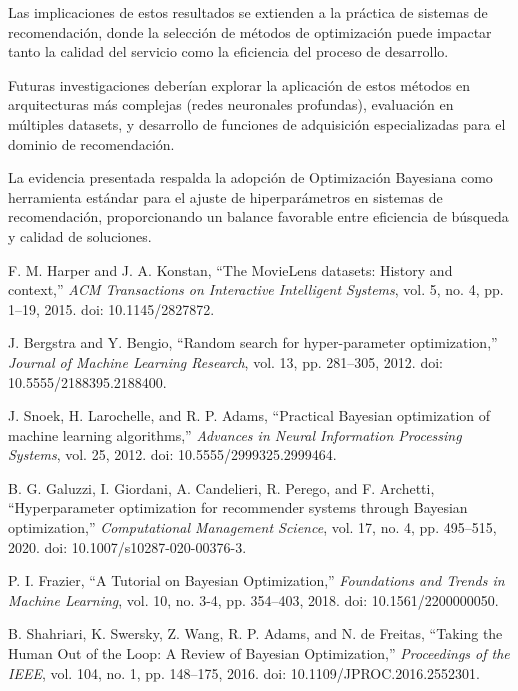 \documentclass[conference]{IEEEtran}
\begin{document}
Las implicaciones de estos resultados se extienden a la práctica de sistemas de recomendación, donde la selección de métodos de optimización puede impactar tanto la calidad del servicio como la eficiencia del proceso de desarrollo.

Futuras investigaciones deberían explorar la aplicación de estos métodos en arquitecturas más complejas (redes neuronales profundas), evaluación en múltiples datasets, y desarrollo de funciones de adquisición especializadas para el dominio de recomendación.

La evidencia presentada respalda la adopción de Optimización Bayesiana como herramienta estándar para el ajuste de hiperparámetros en sistemas de recomendación, proporcionando un balance favorable entre eficiencia de búsqueda y calidad de soluciones.

\begin{thebibliography}{00}

F. M. Harper and J. A. Konstan, ``The MovieLens datasets: History and context,'' \textit{ACM Transactions on Interactive Intelligent Systems}, vol. 5, no. 4, pp. 1--19, 2015. doi: 10.1145/2827872.

J. Bergstra and Y. Bengio, ``Random search for hyper-parameter optimization,'' \textit{Journal of Machine Learning Research}, vol. 13, pp. 281--305, 2012. doi: 10.5555/2188395.2188400.

J. Snoek, H. Larochelle, and R. P. Adams, ``Practical Bayesian optimization of machine learning algorithms,'' \textit{Advances in Neural Information Processing Systems}, vol. 25, 2012. doi: 10.5555/2999325.2999464.

B. G. Galuzzi, I. Giordani, A. Candelieri, R. Perego, and F. Archetti, ``Hyperparameter optimization for recommender systems through Bayesian optimization,'' \textit{Computational Management Science}, vol. 17, no. 4, pp. 495--515, 2020. doi: 10.1007/s10287-020-00376-3.

P. I. Frazier, ``A Tutorial on Bayesian Optimization,'' \textit{Foundations and Trends in Machine Learning}, vol. 10, no. 3-4, pp. 354--403, 2018. doi: 10.1561/2200000050.

B. Shahriari, K. Swersky, Z. Wang, R. P. Adams, and N. de Freitas, ``Taking the Human Out of the Loop: A Review of Bayesian Optimization,'' \textit{Proceedings of the IEEE}, vol. 104, no. 1, pp. 148--175, 2016. doi: 10.1109/JPROC.2016.2552301.


\end{thebibliography}
\end{document}
